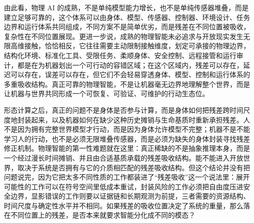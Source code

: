 由此看，物理 AI 的成熟，不是单纯模型能力增长，也不是单纯传感器堆叠，而是建立足够可靠的，这个体系可以由身体、模型、传感器、控制器、环境设计、任务边界和运行体系共同组成，不同方案不是简单优劣，而是残差在不同位置被吸收，复杂性在不同位置展现。更进一步说，成熟的物理智能未必追求与开放现实发生无限高维接触，恰恰相反，它往往需要主动限制接触维度，划定可承接的物理边界，结构化环境、标准化工具、受限任务、柔顺身体、安全控制、远程接管和运行审计，都是在为机器划出一个可行动的容错区域；在这个区域内，残差可以存在，延迟可以存在，误差可以存在，但它们不会轻易穿透身体、模型、控制和运行体系的多重吸收结构。真正可靠的物理智能，不是让机器毫无边界地理解整个世界，而是让机器与世界共同形成一个可恢复、可验证、可维护的行动生态位。

形态计算之后，真正的问题不是身体是否参与计算，而是身体如何把残差跨时间尺度地封装起来，以及机器如何在缺少这种历史摊销与生命基质时重新承担残差。人不是因为拥有完整世界模型才行动，而是因为身体允许模型不完整；机器不是不能学习人的行动，也不是必须无限堆叠传感器，而是必须为缺失的身体封装寻找残差修正机制。物理智能的第一性难题就在这里：真正稀缺的不是抽象推理本身，而是一个经过漫长时间摊销、并且由合适基质承载的残差吸收结构。能不能进入开放世界，取决于系统是否拥有与它的介质相匹配的残差吸收结构。但这个结论并没有把问题说完，因为它把太多不同性质的工作都装进了“残差吸收”这一个说法里：展开可能性的工作可以在符号空间里低成本重试，封装风险的工作必须把自由度压进安全边界，显影错误的工作则要以证据链和长期观测为前提，三者需要的资源结构、时间尺度与确定性水平并不相同。如果残差的吸收位置决定了系统的重量，那么落在不同位置上的残差，是否本来就要求智能分化成不同的模态？
